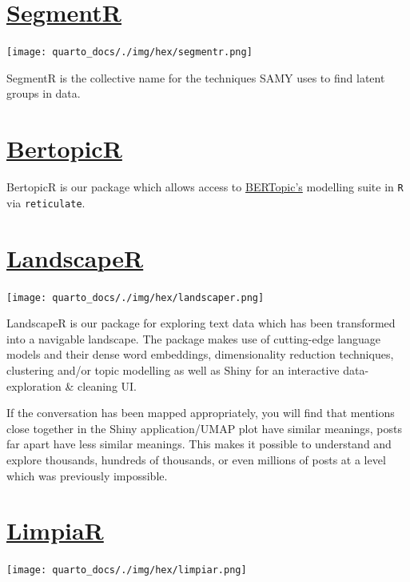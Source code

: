 \documentclass[
  letterpaper,
  DIV=11,
  numbers=noendperiod]{scrreprt}
\begin{document}
\section{\texorpdfstring{\href{https://avery-island.github.io/SegmentR/index.html}{SegmentR}}{SegmentR}}\label{segmentr}

\texttt{[image: quarto\_docs/./img/hex/segmentr.png]}

SegmentR is the collective name for the techniques SAMY uses to find
latent groups in data.

\section{\texorpdfstring{\href{https://aoiferyan-sc.github.io/BertopicR/articles/manipulating-the-model.html}{BertopicR}}{BertopicR}}\label{bertopicr}

BertopicR is our package which allows access to
\href{https://maartengr.github.io/BERTopic/index.html}{BERTopic's}
modelling suite in \texttt{R} via \texttt{reticulate}.

\section{\texorpdfstring{\href{https://github.com/jpcompartir/LandscapeR}{LandscapeR}}{LandscapeR}}\label{landscaper}

\texttt{[image: quarto\_docs/./img/hex/landscaper.png]}

LandscapeR is our package for exploring text data which has been
transformed into a navigable landscape. The package makes use of
cutting-edge language models and their dense word embeddings,
dimensionality reduction techniques, clustering and/or topic modelling
as well as Shiny for an interactive data-exploration \& cleaning UI.

If the conversation has been mapped appropriately, you will find that
mentions close together in the Shiny application/UMAP plot have similar
meanings, posts far apart have less similar meanings. This makes it
possible to understand and explore thousands, hundreds of thousands, or
even millions of posts at a level which was previously impossible.

\section{\texorpdfstring{\href{https://github.com/jpcompartir/LimpiaR}{LimpiaR}}{LimpiaR}}\label{limpiar}

\texttt{[image: quarto\_docs/./img/hex/limpiar.png]}
\end{document}
